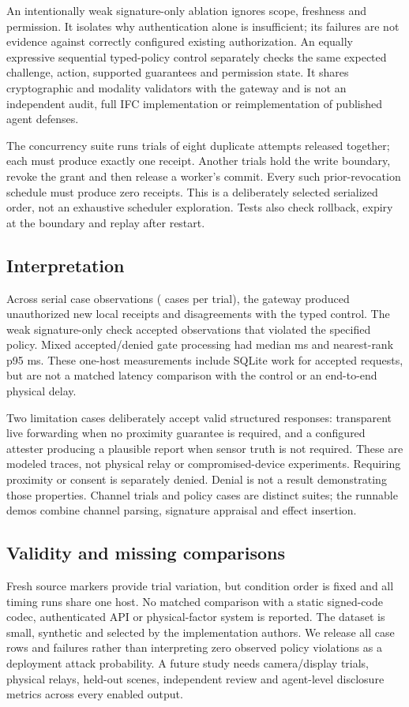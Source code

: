 An intentionally weak signature-only ablation ignores scope, freshness and
permission. It isolates why authentication alone is insufficient; its failures
are not evidence against correctly configured existing authorization. An equally
expressive sequential typed-policy control separately checks the same expected
challenge, action, supported guarantees and permission state. It shares
cryptographic and modality validators with the gateway and is not an independent
audit, full IFC implementation or reimplementation of published agent defenses.

The concurrency suite runs \BenchTrials{} trials of eight duplicate attempts
released together; each must produce exactly one receipt. Another
\BenchTrials{} trials hold the write boundary, revoke the grant and then release a
worker's commit. Every such prior-revocation schedule must produce zero receipts.
This is a deliberately selected serialized order, not an exhaustive scheduler
exploration. Tests also check rollback, expiry at the boundary and replay after
restart.

\subsection{Interpretation}
Across \SecurityObservations{} serial case observations
(\SecurityCases{} cases per trial), the gateway produced
\UnauthorizedEffects{} unauthorized new local receipts and
\TypedDisagreements{} disagreements with the typed control. The weak
signature-only check accepted \SignatureFalseAccepts{} observations that violated
the specified policy. Mixed accepted/denied gate processing had median
\GateMedian{} ms and nearest-rank p95 \GatePninetyfive{} ms. These one-host
measurements include SQLite work for accepted requests, but are not a matched
latency comparison with the control or an end-to-end physical delay.

Two limitation cases deliberately accept valid structured responses: transparent
live forwarding when no proximity guarantee is required, and a configured
attester producing a plausible report when sensor truth is not required. These
are modeled traces, not physical relay or compromised-device experiments. Requiring
proximity or consent is separately denied. Denial is not a result demonstrating
those properties. Channel trials and policy cases are distinct suites; the
runnable demos combine channel parsing, signature appraisal and effect insertion.

\subsection{Validity and missing comparisons}
Fresh source markers provide trial variation, but condition order is fixed and
all timing runs share one host. No matched comparison with a static signed-code
codec, authenticated API or physical-factor system is reported. The dataset is
small, synthetic and selected by the implementation authors. We release all
case rows and failures rather than interpreting zero observed policy violations
as a deployment attack probability. A future study needs camera/display trials,
physical relays, held-out scenes, independent review and agent-level disclosure
metrics across every enabled output.

